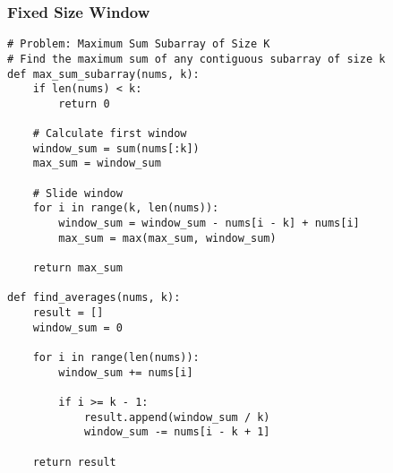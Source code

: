 \documentclass[10pt,a4paper]{article}
\begin{document}
\subsubsection{Fixed Size Window}
\begin{lstlisting}
# Problem: Maximum Sum Subarray of Size K
# Find the maximum sum of any contiguous subarray of size k
def max_sum_subarray(nums, k):
    if len(nums) < k:
        return 0

    # Calculate first window
    window_sum = sum(nums[:k])
    max_sum = window_sum

    # Slide window
    for i in range(k, len(nums)):
        window_sum = window_sum - nums[i - k] + nums[i]
        max_sum = max(max_sum, window_sum)

    return max_sum

def find_averages(nums, k):
    result = []
    window_sum = 0

    for i in range(len(nums)):
        window_sum += nums[i]

        if i >= k - 1:
            result.append(window_sum / k)
            window_sum -= nums[i - k + 1]

    return result
\end{lstlisting}
\end{document}
